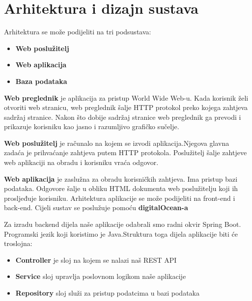 \chapter{Arhitektura i dizajn sustava}

    \hfill\break
    Arhitektura se može podijeliti na tri podsustava: 
    \begin{itemize}
		\item \textbf{Web poslužitelj} 
		\item \textbf{Web aplikacija } 
		\item \textbf{Baza podataka } 
	\end{itemize}
	\hfill\break	
	
	\textbf{Web preglednik} je aplikacija za pristup World Wide Web-u. Kada korisnik želi otvoriti web stranicu, web preglednik šalje HTTP protokol preko kojega zahtjeva sadržaj stranice. Nakon što dobije sadržaj stranice web preglednik ga prevodi i prikazuje korisniku kao jasno i razumljivo grafičko sučelje. 
	\newline \newline
	
	\textbf{Web poslužitelj} je računalo na kojem se izvodi aplikacija.Njegova glavna zadaća je prihvaćanje zahtjeva putem HTTP protokola. Poslužitelj šalje zahtjeve web aplikaciji na obradu i korisniku vraća odgovor.
	\newline \newline
	
	\textbf{Web aplikacija} je zaslužna za obradu korisničkih zahtjeva. Ima pristup bazi podataka. Odgovore šalje u obliku HTML dokumenta web poslužitelju koji ih prosljeđuje korisniku. Arhitektura aplikacije se može podijeliti na front-end i back-end. Cijeli sustav se poslužuje pomoću \textbf{digitalOcean-a}
	\newline\newline
	
	Za izradu backend dijela naše aplikacije odabrali smo radni okvir Spring Boot. Programski jezik koji koristimo je Java.\newline Struktura toga dijela aplikacije biti će troslojna:
	\begin{itemize}
		\item \textbf{Controller} je sloj na kojem se nalazi naš REST API
		\item \textbf{Service} sloj upravlja poslovnom logikom naše aplikacije
		\item \textbf{Repository} sloj služi za pristup podatcima u bazi podataka
	\end{itemize}
					    
